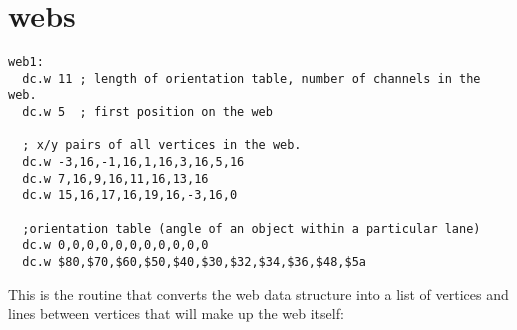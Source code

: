 \chapter{webs}
\label{sec:webs}
\lstset{style=68KStyle}

\begin{lstlisting}
web1: 
  dc.w 11 ; length of orientation table, number of channels in the web.
  dc.w 5  ; first position on the web

  ; x/y pairs of all vertices in the web.
  dc.w -3,16,-1,16,1,16,3,16,5,16
  dc.w 7,16,9,16,11,16,13,16
  dc.w 15,16,17,16,19,16,-3,16,0

  ;orientation table (angle of an object within a particular lane)
  dc.w 0,0,0,0,0,0,0,0,0,0,0  
  dc.w $80,$70,$60,$50,$40,$30,$32,$34,$36,$48,$5a
\end{lstlisting}

This is the routine that converts the web data structure into a list of vertices and lines between vertices
that will make up the web itself:

